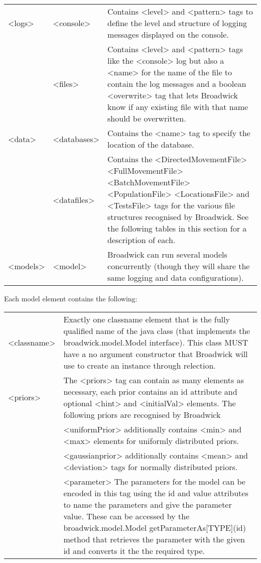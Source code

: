 \begin{tabulary}{1.0\textwidth}{llp{8cm}}
\toprule
<logs> & <console> & Contains <level> and <pattern> tags to define the level and structure of logging messages displayed on the console.\\
       & <files> & Contains <level> and <pattern> tags like the <console> log but also a <name> for the name of the file to contain the log messages and a boolean <overwrite> tag that lets Broadwick know if any existing file with that name should be overwritten.\\
<data> & <databases> & Contains the <name> tag to specify the location of the database.\\
       & <datafiles> & Contains the <DirectedMovementFile> <FullMovementFile> <BatchMovementFile> <PopulationFile> <LocationsFile> and <TestsFile> tags for the various file structures recognised by Broadwick. See the following tables in this section for a description of each.\\
<models> & <model> & Broadwick can run several models concurrently (though they will share the same logging and data configurations). \\
\bottomrule
\end{tabulary}

\vskip 1cm
Each model element contains the following:

\begin{tabulary}{0.3\linewidth}{l p{10cm}}
\toprule
<classname> & Exactly one classname element that is the fully qualified name of the java  class (that implements the broadwick.model.Model interface). This class MUST have a no argument constructor that Broadwick will use to create an instance through relection.\\
<priors> & The <priors> tag can contain as many elements as necessary, each prior contains an id attribute and optional <hint> and <initialVal> elements. The following priors are recognised by Broadwick\\
         & <uniformPrior> additionally contains <min> and <max> elements for uniformly distributed priors.\\
         & <gaussianprior> additionally contains <mean> and <deviation> tags for normally distributed priors.\\
         & <parameter> The parameters for the model can be encoded in this tag using the id and value attributes to name the parameters and give the parameter value. These can be accessed by the broadwick.model.Model getParameterAs[TYPE](id) method that retrieves the parameter with the given id and converts it the the required type.\\
\bottomrule
\end{tabulary}

